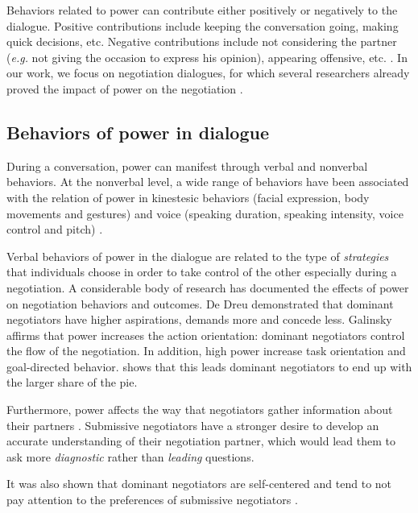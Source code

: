 \documentclass{article}
\begin{document}
	Behaviors related to power can contribute either positively or negatively to the dialogue. Positive contributions include keeping the conversation going, making quick decisions, etc. Negative contributions include not considering the partner (\emph{e.g.} not giving the occasion to express his opinion), appearing offensive, etc. \cite{zablotskaya2012relating}. In our work, we focus on negotiation dialogues, for which several researchers already proved the impact of power on the negotiation \cite{van2006power}.
	
	\subsection{Behaviors of power in dialogue}
	\label{domDialogue}
	During a conversation, power can manifest through verbal and nonverbal behaviors.	
	At the nonverbal level, a wide range of behaviors have been associated with the relation of power in kinestesic behaviors (facial expression, body movements and gestures) and voice (speaking duration, speaking intensity, voice control and pitch) \cite{burgoonnonverbal}.
	
	Verbal behaviors of power in the dialogue are related to the type of \textit{strategies} that individuals choose in order to take control of the other especially during a negotiation. A considerable body of research has documented the effects of power on negotiation behaviors and outcomes. De Dreu demonstrated that \cite{de1995impact} dominant negotiators have higher aspirations, demands more and concede less. Galinsky \cite{galinsky2003power} affirms that power increases the action orientation: dominant negotiators control the flow of the negotiation. In addition, high power increase task orientation and goal-directed behavior. \cite{giebels2000interdependence} shows that this leads dominant negotiators to end up with the larger share of the pie.
	
	Furthermore, power affects the way that negotiators gather information about their partners \cite{de2004influence}. Submissive negotiators have a stronger desire to develop an accurate understanding of their negotiation partner, which would lead them to ask more \emph{diagnostic} rather than \emph{leading} questions.
	
	It was also shown that dominant negotiators are self-centered and tend to not pay attention to the preferences of submissive negotiators \cite{fiske1993controlling,de1995impact}.
\end{document}
